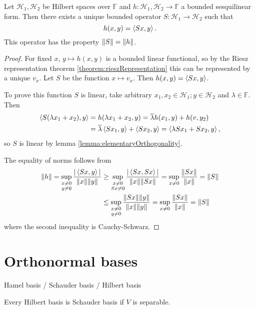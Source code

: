\begin{proposition} \label{prop:sesquilinearRepresentation}
Let $\mathcal{H}_1,\mathcal{H}_2$ be Hilbert spaces over $\mathbb{F}$ and $h:\mathcal{H}_1,\mathcal{H}_2\to\mathbb{F}$ a bounded sesquilinear form. Then there exists a unique bounded operator $S:\mathcal{H}_1 \to \mathcal{H}_2$ such that
\[ h(x,y) = \left\langle Sx,y \right\rangle. \]
This operator has the property $\lVert S\rVert = \lVert h\rVert$.
\end{proposition}
\begin{proof}
For fixed $x$, $y\mapsto h(x,y)$ is a bounded linear functional, so by the Riesz representation theorem \ref{theorem:rieszRepresentation} this can be represented by a unique $v_x$. Let $S$ be the function $x\mapsto v_x$. Then $h(x,y) = \left\langle Sx,y \right\rangle$.

To prove this function $S$ is linear, take arbitrary $x_1,x_2\in \mathcal{H}_1;y\in \mathcal{H}_2$ and $\lambda \in \mathbb{F}$. Then
\begin{align*}
\left\langle S(\lambda x_1+ x_2),y \right\rangle &= h(\lambda x_1+ x_2, y) = \overline{\lambda} h(x_1,y)+h(v,y_2) \\
&= \overline{\lambda} \left\langle Sx_1, y \right\rangle + \left\langle Sx_2, y \right\rangle = \left\langle \lambda Sx_1 + Sx_2,y \right\rangle,
\end{align*}
so $S$ is linear by lemma \ref{lemma:elementaryOrthogonality}.

The equality of norms follows from
\begin{align*}
\lVert h\rVert = \sup_{\substack{x\neq 0 \\ y\neq 0}}\frac{|\left\langle Sx,y \right\rangle|}{\lVert x\rVert\lVert y\rVert} &\geq \sup_{\substack{x\neq 0 \\ Sx\neq 0}}\frac{|\left\langle Sx,Sx \right\rangle|}{\lVert x\rVert\lVert Sx\rVert} = \sup_{x\neq 0}\frac{\lVert Sx\rVert}{\lVert x\rVert} = \lVert S\rVert \\
&\leq \sup_{\substack{x\neq 0 \\ y\neq 0}}\frac{\lVert Sx\rVert\lVert y\rVert}{\lVert x\rVert\lVert y\rVert} = \sup_{x\neq 0}\frac{\lVert Sx\rVert}{\lVert x\rVert} = \lVert S\rVert
\end{align*}
where the second inequality is Cauchy-Schwarz.
\end{proof}

\section{Orthonormal bases}

Hamel basis / Schauder basis / Hilbert basis

Every Hilbert basis is Schauder basis if $V$ is separable.

